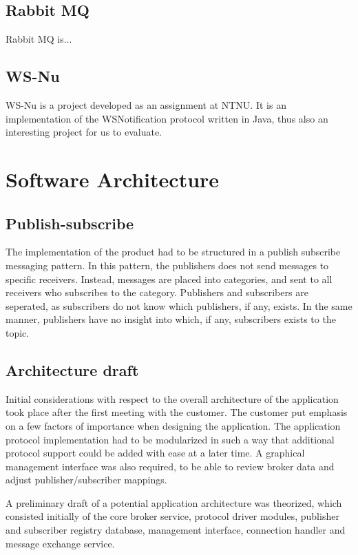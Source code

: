 \subsection{Rabbit MQ}

Rabbit MQ is...

\subsection{WS-Nu}

WS-Nu is a project developed as an assignment at NTNU. It is an implementation of the WSNotification protocol written in Java, thus also an interesting project for us to evaluate.

\section{Software Architecture}

\subsection{Publish-subscribe}

The implementation of the product had to be structured in a publish subscribe messaging pattern. In this pattern, the publishers does not send messages to specific receivers. Instead, messages are placed into categories, and sent to all receivers who subscribes to the category. Publishers and subscribers are seperated, as subscribers do not know which publishers, if any, exists. In the same manner, publishers have no insight into which, if any, subscribers exists to the topic.


\subsection{Architecture draft}

Initial considerations with respect to the overall architecture of the application took place after the first meeting with the customer. The customer put emphasis on a few factors of importance when designing the application. The application protocol implementation had to be modularized in such a way that additional protocol support could be added with ease at a later time. A graphical management interface was also required, to be able to review broker data and adjust publisher/subscriber mappings.

A preliminary draft of a potential application architecture was theorized, which consisted initially of the core broker service, protocol driver modules, publisher and subscriber registry database, management interface, connection handler and message exchange service.


